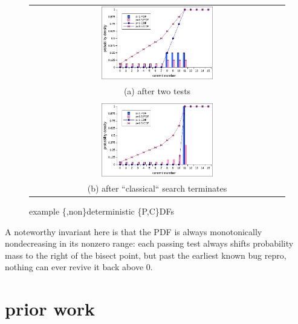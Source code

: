 \documentclass[11pt]{sigplanconf}
\begin{document}
% 
% 

% 
% 

\begin{figure}[t]
	\begin{tabular}{c}
	\includegraphics[width=0.45\textwidth]{example.pdf}
	\\
		(a) after two tests
		\\
		\\

	\includegraphics[width=0.45\textwidth]{example2.pdf}
	\\
		(b) after ``classical`` search terminates
	\end{tabular}
	\caption{example \{,non\}deterministic \{P,C\}DFs}
	\label{fig:example}
\end{figure}

A noteworthy invariant here is that the PDF is always monotonically nondecreasing in its nonzero range:
each passing test always shifts probability mass to the right of the bisect point,
but past the earliest known bug repro, nothing can ever revive it back above 0.


\section{prior work}
\label{sec:prior}
\end{document}
